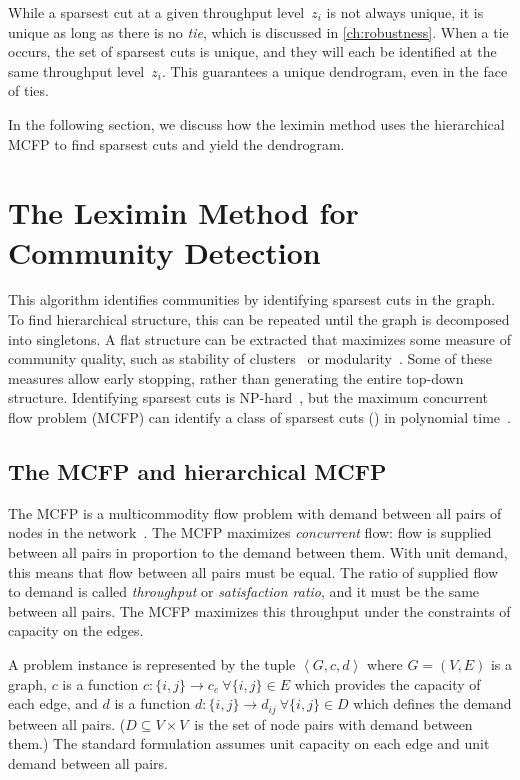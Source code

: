While a sparsest cut at a given throughput level~$z_i$ is not always unique, it is unique as long as there is no \emph{tie}, which is discussed in \autoref{ch:robustness}. When a tie occurs, the set of sparsest cuts is unique, and they will each be identified at the same throughput level~$z_i$. This guarantees a unique dendrogram, even in the face of ties.


In the following section, we discuss how the leximin method uses the hierarchical MCFP to find sparsest cuts and yield the dendrogram.






\section{The Leximin Method for Community Detection} \label{sec:leximin algorithm}

This algorithm identifies communities by identifying sparsest cuts in the graph. To find hierarchical structure, this can be repeated until the graph is decomposed into singletons. A flat structure can be extracted that maximizes some measure of community quality, such as stability of clusters~\cite{mcinnes2017hdbscan} or modularity~\cite{newman2006modularity}. Some of these measures allow early stopping, rather than generating the entire top-down structure. Identifying sparsest cuts is NP-hard~\cite{shahrokhi1990maximum, matula1990sparsest}, but the maximum concurrent flow problem (MCFP) can identify a class of sparsest cuts () in polynomial time~\cite{matula1990sparsest}. 




\subsection{The MCFP and hierarchical MCFP}

The MCFP is a multicommodity flow problem with demand between all pairs of nodes in the network~\cite{matula1985concurrent}. The MCFP maximizes \emph{concurrent} flow: flow is supplied between all pairs in proportion to the demand between them. With unit demand, this means that flow between all pairs must be equal. The ratio of supplied flow to demand is called \emph{throughput} or \emph{satisfaction ratio}, and it must be the same between all pairs. The MCFP maximizes this throughput under the constraints of capacity on the edges.

A problem instance is represented by the tuple $\left< G, c, d \right>$ where $G = (V, E)$ is a graph, $c$ is a function $c\colon \{i, j\}  \rightarrow c_e \  \forall \{i, j\} \in E$ which provides the capacity of each edge, and $d$ is a function $d\colon \{i, j\}  \rightarrow d_{ij} \  \forall \{i, j\} \in D$ which defines the demand between all pairs. ($D \subseteq V \times V$~is the set of node pairs with demand between them.) The standard formulation assumes unit capacity on each edge and unit demand between all pairs.

